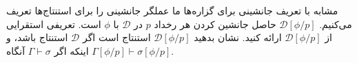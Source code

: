 مشابه با تعریف جانشینی برای گزاره‌ها ما عملگر جانشینی را برای استنتاج‌ها تعریف می‌کنیم.
$\mathcal{D}[\phi/p]$
حاصل جانشین کردن هر رخداد $p$ در $\mathcal{\mathcal{D}}$ با $\phi$ است.
تعریفی استقرایی از
$\mathcal{D}[\phi/p]$
ارائه کنید. نشان بدهید
$\mathcal{D}[\phi/p]$
استنتاج است اگر
$\mathcal{D}$
استنتاج باشد، و اینکه اگر
$\Gamma\vdash\sigma$
آنگاه
$\Gamma[\phi/p]\vdash\sigma[\phi/p]$.